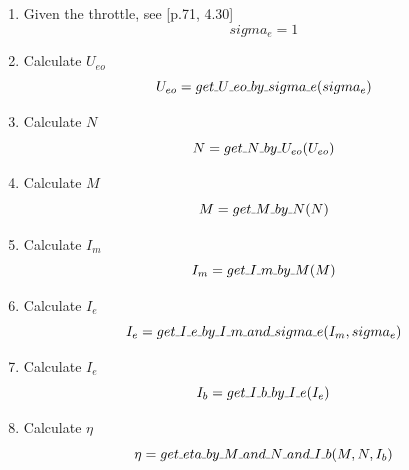 \documentclass{article} %
\numberwithin{equation}{section} %
\newcommand{\SL}{\rule{.3em}{.3pt}} %
\begin{document}
\begin{enumerate}

\item Given the throttle, see \cite{qq}[p.71, 4.30]
\begin{equation}
sigma_e = 1 \label{q_maxthrottle.sigma_e}
\end{equation}

\item Calculate $U_{eo}$
\begin{equation}
U_{eo} = get\SL U\SL eo\SL by\SL sigma\SL e (sigma_e) \label{q_maxthrottle.U_eo}
\end{equation}

\item Calculate $N$
\begin{equation}
N = get\SL N\SL by\SL U_{eo} (U_{eo}) \label{q_maxthrottle.N}
\end{equation}

\item Calculate $M$
\begin{equation}
M = get\SL M\SL by\SL N (N) \label{q_maxthrottle.M}
\end{equation}

\item Calculate $I_m$
\begin{equation}
I_m = get\SL I\SL m\SL by\SL M (M) \label{q_maxthrottle.I_m}
\end{equation}

\item Calculate $I_e$
\begin{equation}
I_e = get\SL I\SL e\SL by\SL I\SL m\SL and\SL sigma\SL e (I_m, sigma_e) \label{q_maxthrottle.I_e}
\end{equation}

\item Calculate $I_e$
\begin{equation}
I_b = get\SL I\SL b\SL by\SL I\SL e (I_e) \label{q_maxthrottle.I_b}
\end{equation}

\item Calculate $\eta$
\begin{equation}
\eta = get\SL eta\SL by\SL M\SL and\SL N\SL and\SL I\SL b (M, N, I_b) \label{q_maxthrottle.eta}
\end{equation}

\end{enumerate}


\newpage
\end{document}
